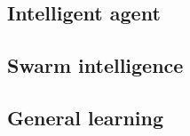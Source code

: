 \subsection{Intelligent agent}\label{subsec:intelligent-agent}

\subsection{}\label{subsec:mas}

\subsection{Swarm intelligence}\label{subsec:swarm-intelligence}


\subsection{General learning}\label{subsec:general-learning}
